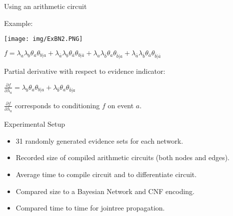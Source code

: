 \documentclass[xcolor={table}]{beamer}
\begin{document}
\begin{frame}{Using an arithmetic circuit}

Example:

\texttt{[image: img/ExBN2.PNG]}

$f = \lambda_{a}\lambda_{b}\theta_{a}\theta_{b|a} + \lambda_{\bar{a}}\lambda_{b}\theta_{\bar{a}}\theta_{b|\bar{a}} + \lambda_{a}\lambda_{\bar{b}}\theta_{a}\theta_{\bar{b}|a} + \lambda_{\bar{a}}\lambda_{\bar{b}}\theta_{\bar{a}}\theta_{\bar{b}|\bar{a}}$

\vspace{0.5cm}

Partial derivative with respect to evidence indicator:

$\frac{\partial f}{\partial \lambda_{a}} = \lambda_{b}\theta_{a}\theta_{b|a} + \lambda_{\bar{b}}\theta_{a}\theta_{\bar{b}|a}$

\vspace{0.5cm}

$\frac{\partial f}{\partial \lambda_{a}}$ corresponds to conditioning $f$ on event $a$.
\end{frame}

\begin{frame}{Experimental Setup}
\begin{itemize}

\item 31 randomly generated evidence sets for each network.
\item Recorded size of compiled arithmetic circuits (both nodes and edges).
\item Average time to compile circuit and to differentiate circuit.
\item Compared size to a Bayesian Network and CNF encoding.
\item Compared time to time for jointree propagation.

\end{itemize}
\end{frame}
\end{document}
